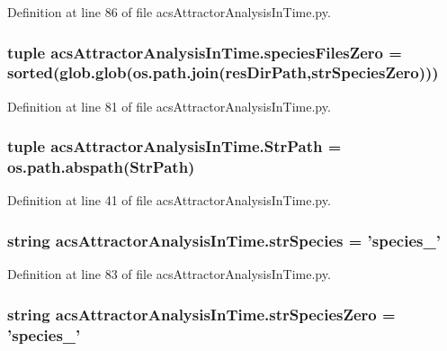 Definition at line 86 of file acs\-Attractor\-Analysis\-In\-Time.\-py.

\hypertarget{a00091_a4657fd3a80cf1c76ab075d62d8de3bf3}{
\subsubsection[{species\-Files\-Zero}]{\setlength{\rightskip}{0pt plus 5cm}tuple acs\-Attractor\-Analysis\-In\-Time.\-species\-Files\-Zero = sorted(glob.\-glob(os.\-path.\-join({\bf res\-Dir\-Path},{\bf str\-Species\-Zero})))}}\label{a00091_a4657fd3a80cf1c76ab075d62d8de3bf3}


Definition at line 81 of file acs\-Attractor\-Analysis\-In\-Time.\-py.

\hypertarget{a00091_a1d168f4d444ea1d02f186a7568344fba}{
\subsubsection[{Str\-Path}]{\setlength{\rightskip}{0pt plus 5cm}tuple acs\-Attractor\-Analysis\-In\-Time.\-Str\-Path = os.\-path.\-abspath(Str\-Path)}}\label{a00091_a1d168f4d444ea1d02f186a7568344fba}


Definition at line 41 of file acs\-Attractor\-Analysis\-In\-Time.\-py.

\hypertarget{a00091_ac1f05e7db61bcc83ea1ed27460462202}{
\subsubsection[{str\-Species}]{\setlength{\rightskip}{0pt plus 5cm}string acs\-Attractor\-Analysis\-In\-Time.\-str\-Species = 'species\-\_\-'}}\label{a00091_ac1f05e7db61bcc83ea1ed27460462202}


Definition at line 83 of file acs\-Attractor\-Analysis\-In\-Time.\-py.

\hypertarget{a00091_aea2d717887265b294c623099d2495d4f}{
\subsubsection[{str\-Species\-Zero}]{\setlength{\rightskip}{0pt plus 5cm}string acs\-Attractor\-Analysis\-In\-Time.\-str\-Species\-Zero = 'species\-\_\-'}}\label{a00091_aea2d717887265b294c623099d2495d4f}


